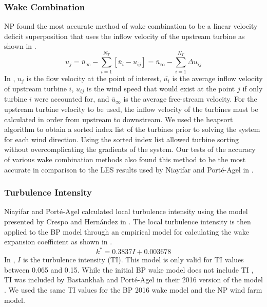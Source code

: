 \documentclass[conf]{new-aiaa}
\begin{document}
\subsubsection{Wake Combination}
NP found the most accurate method of wake combination to be a linear velocity deficit superposition that uses the inflow velocity of the upstream turbine as shown in . 
%
\begin{equation}\label{eq:wake-comb-lin}
	u_j = \bar{u}_\infty - \sum_{i=1}^{N_T} [\bar{u}_i - u_{ij}] = \bar{u}_\infty - \sum_{i=1}^{N_T} \Delta u_{ij}
\end{equation}
%
In , $u_j$ is the flow velocity at the point of interest, $\bar{u_i}$ is the average inflow velocity of upstream turbine $i$, $u_{ij}$ is the wind speed that would exist at the point $j$ if only turbine $i$ were accounted for, and $\bar{u}_{\infty}$ is the average free-stream velocity. For the upstream turbine velocity to be used, the inflow velocity of the turbines must be calculated in order from upstream to downstream. We used the heapsort algorithm to obtain a sorted index list of the turbines prior to solving the system for each wind direction. Using the sorted index list allowed turbine sorting without overcomplicating the gradients of the system. Our tests of the accuracy of various wake combination methods also found this method to be the most accurate in comparison to the LES results used by Niayifar and Port\'{e}-Agel in \cite{niayifar2016}.

\subsubsection{Turbulence Intensity}\label{sec:ti}
Niayifar and Port\'{e}-Agel calculated local turbulence intensity using the model presented by Crespo and Hern\'{a}ndez in \cite{crespo1996}. The local turbulence intensity is then applied to the BP model through an empirical model for calculating the wake expansion coefficient as shown in  \cite{niayifar2016}.
 \begin{equation} \label{eq:ti_npa}
 	k^* = 0.3837 I + 0.003678
 \end{equation}
%
In , $I$ is the turbulence intensity (TI). This model is only valid for TI values between 0.065 and 0.15. While the initial BP wake model does not include TI \cite{bastankhah2014}, TI was included by Bastankhah and Port\'{e}-Agel in their 2016 version of the model \cite{bastankhah2016}. We used the same TI values for the BP 2016 wake model and the NP wind farm model. 
\end{document}

